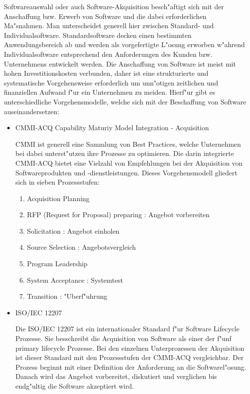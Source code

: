 Softwareauswahl oder auch Software-Akquisition besch"aftigt sich mit der Anschaffung bzw. Erwerb von Software und die dabei erforderlichen Ma"snahmen. Man unterscheidet generell hier zwischen Standard- und Individualsoftware. Standardsoftware decken einen bestimmten Anwendungsbereich ab und werden als vorgefertigte L"osung erworben w"ahrend Individualsoftware entsprechend den Anforderungen des Kunden bzw. Unternehmens entwickelt werden. Die Anschaffung von Software ist meist mit hohen Investitionskosten verbunden, daher ist eine strukturierte und systematische Vorgehensweise erforderlich um unn"otigen zeitlichen und finanziellen Aufwand f"ur ein Unternehmen zu meiden. Hierf"ur gibt es unterschiedliche Vorgehensmodelle, welche sich mit der Beschaffung von Software auseinandersetzen:

\begin{itemize}

	\item CMMI-ACQ Capability Maturiy Model Integration - Acquisition
	
	CMMI ist generell eine Sammlung von Best Practices, welche Unternehmen bei dabei unterst"utzen ihre Prozesse zu optimieren. Die darin integrierte CMMI-ACQ bietet eine Vielzahl von Empfehlungen bei der Akquisition von Softwareprodukten und -dienstleistungen. Dieses Vorgehensmodell gliedert sich in sieben Prozessstufen\cite{Kneuper2009}:
	\begin{enumerate}
		\item Acquisition Planning
		\item RFP (Request for Proposal) preparing : Angebot vorbereiten
		\item Solicitation : Angebot einholen
		\item Source Selection : Angebotsvergleich
		\item Program Leadership
		\item System Acceptance : Systemtest
		\item Transition : "Uberf"uhrung
	\end{enumerate}
	
	\item  ISO/IEC 12207
	
	Die ISO/IEC 12207 ist ein internationaler Standard f"ur Software Lifecycle Prozesse. Sie besschreibt die Acquisition von Software als einer der f"unf primary lifecycle Prozesse. Bei den einzelnen Unterprozessen der Akquisition ist dieser Standard mit den Prozessstufen der CMMI-ACQ vergleichbar. Der Prozess beginnt mit einer Definition der Anforderung an die Softwarel"osung. Danach wird das Angebot vorbereitet, diskutiert und verglichen bis endg"ultig die Software akzeptiert wird.\cite{LaWa2007}

\end{itemize}